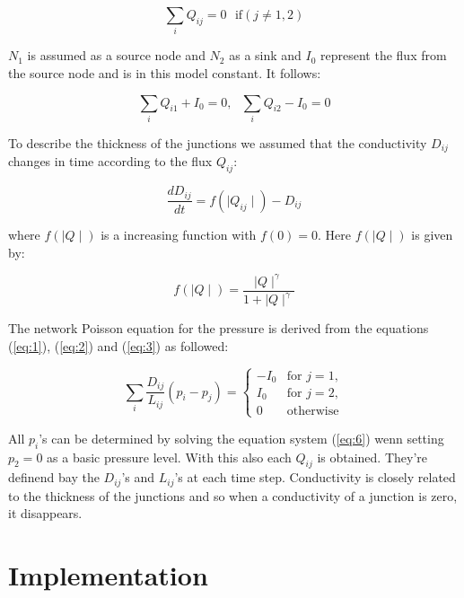 \documentclass[11pt]{scrartcl}
\begin{document}
\begin{equation}
	\label{eq:2}
	\sum_{i} Q_{ij}=0 \,\,\,\, \mathrm{if} \left(j\ne 1,2\right)
\end{equation}

$N_1$ is assumed as a source node and $N_2$ as a sink and $I_0$ represent the flux from the source node and is in this model constant. It follows:

\begin{equation}
	\label{eq:3}
	\sum_{i} Q_{i1}+I_0=0, \,\,\,\, \sum_{i} Q_{i2}-I_0=0
\end{equation}

To describe the thickness of the junctions we assumed that the conductivity $D_{ij}$ changes in time according to the flux $Q_{ij}$:

\begin{equation}
	\label{eq:4}
	\frac{dD_{ij}}{dt}=f\left(\mid Q_{ij} \mid \right)-D_{ij}
\end{equation}

where $f\left(\mid Q \mid \right)$ is a increasing function with $f(0)=0$. Here $f\left(\mid Q \mid \right)$ is given by:

\begin{equation}
	\label{eq:5}
	f\left(\mid Q \mid \right)=\frac{\mid Q \mid^\gamma }{1+\mid Q \mid^\gamma}
\end{equation}

The network Poisson equation for the pressure is derived from the equations (\ref{eq:1}), (\ref{eq:2}) and (\ref{eq:3}) as followed:

\begin{equation}
	\label{eq:6}
	\sum_{i} \frac{D_{ij}}{L_{ij}}\left(p_i-p_j\right)= \begin{cases}
										-I_0 & \mathrm{for}\,\, j=1,\\
										I_0 & \mathrm{for} \,\,j=2,\\
										0 & \mathrm{otherwise}
										\end{cases}
\end{equation}

All $p_i$'s can be determined by solving the equation system (\ref{eq:6}) wenn setting $p_2=0$ as a basic pressure level. With this also each $Q_{ij}$ is obtained. They're definend bay the $D_{ij}$'s and $L_{ij}$'s  at each time step. Conductivity is closely related to the thickness of the junctions and so when a conductivity of a junction is zero, it disappears.

\section{Implementation}
\end{document}
